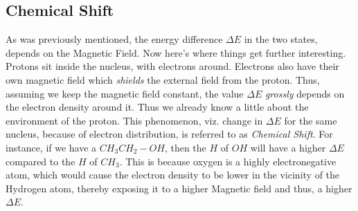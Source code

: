 	\subsection{Chemical Shift}
		As was previously mentioned, the energy difference $\Delta E$ in the two states, depends on the Magnetic Field. Now here's where things get further interesting. Protons sit inside the nucleus, with electrons around. Electrons also have their own magnetic field which \emph{shields} the external field from the proton. 
		Thus, assuming we keep the magnetic field constant, the value $\Delta E$ \emph{grossly} depends on the electron density around it. Thus we already know a little about the environment of the proton. This phenomenon, viz. change in $\Delta E$ for the same nucleus, because of electron distribution, is referred to as \emph{Chemical Shift}. For instance, if we have a $CH_3CH_2-OH$, then the $H$ of $OH$ will have a higher $\Delta E$ compared to the $H$ of $CH_3$. This is because oxygen is a highly electronegative atom, which would cause the electron density to be lower in the vicinity of the Hydrogen atom, thereby exposing it to a higher Magnetic field and thus, a higher $\Delta E$.
